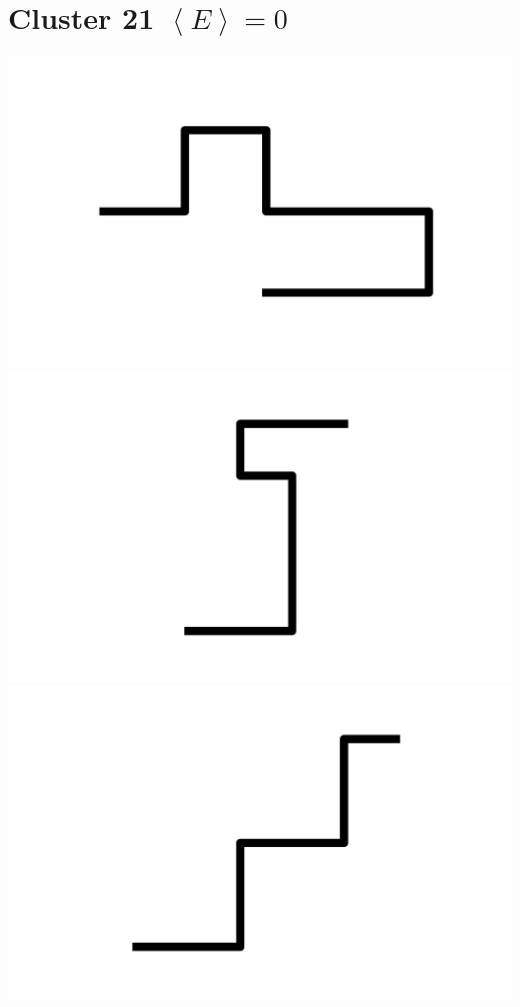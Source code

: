 \documentclass[]{report}
\begin{document}
\section{Cluster 21 $\left < E \right > = 0$} 
\includegraphics[scale=.1]{pictures/21/state_cluster_shapes_0.pdf} 
\includegraphics[scale=.1]{pictures/21/state_cluster_shapes_1.pdf} 
\includegraphics[scale=.1]{pictures/21/state_cluster_shapes_2.pdf} 
\end{document}
